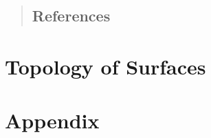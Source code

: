 

\setmainlanguage[variant=british]{english}
\newcommand{\fach}{Mapping Class Groups, Homological Stability and Madsen-Weiss-Theory}
\newcommand{\shortFach}{Madsen-Weiss-Theory}
\newcommand{\semester}{Wise 2016}
\newcommand{\homepage}{https://wwwmath.uni-muenster.de/reine/u/topos/lehre/WS2015-2016/Topologie2/}

\newcommand{\prof}{Prof.\ Dr.\ Johannes Ebert}
\publishers{}



\maketitle
\begin{abstract}

\section*{References}

\end{abstract}

\tableofcontents
\cleardoubleoddemptypage

\setcounter{page}{1}
\setcounter{footnote}{0}




\chapter{Topology of Surfaces}


\cleardoubleoddemptypage
{}
\setcounter{page}{1}
\cleardoubleoddemptypage
\appendix

\chapter{Appendix} %
\label{chap:appendix}

\printindex
\printbibliography
\listoffigures
\todototoc\listoftodos
